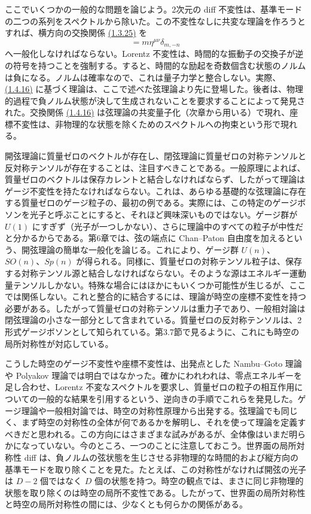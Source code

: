 ここでいくつかの一般的な問題を論じよう。2次元の diff 不変性は、基準モードの二つの系列をスペクトルから除いた。この不変性なしに共変な理論を作ろうとすれば、横方向の交換関係 \hyperref[eq:1.3.25a]{(1.3.25)} を
\begin{equation}
[\alpha_m^\mu,\alpha_n^\nu]=m\eta^{\mu\nu}\delta_{m,-n}
\tag{1.4.16}\label{eq:1.4.16}
\end{equation}
へ一般化しなければならない。Lorentz 不変性は、時間的な振動子の交換子が逆の符号を持つことを強制する。すると、時間的な励起を奇数個含む状態のノルムは負になる。ノルムは確率なので、これは量子力学と整合しない。実際、\hyperref[eq:1.4.16]{(1.4.16)} に基づく理論は、ここで述べた弦理論より先に登場した。後者は、物理的過程で負ノルム状態が決して生成されないことを要求することによって発見された。交換関係 \hyperref[eq:1.4.16]{(1.4.16)} は弦理論の共変量子化（次章から用いる）で現れ、座標不変性は、非物理的な状態を除くためのスペクトルへの拘束という形で現れる。

開弦理論に質量ゼロのベクトルが存在し、閉弦理論に質量ゼロの対称テンソルと反対称テンソルが存在することは、注目すべきことである。一般原理によれば、質量ゼロのベクトルは保存カレントと結合しなければならず、したがって理論はゲージ不変性を持たなければならない。これは、あらゆる基礎的な弦理論に存在する質量ゼロのゲージ粒子の、最初の例である。実際には、この特定のゲージボソンを光子と呼ぶことにすると、それほど興味深いものではない。ゲージ群が $U(1)$ にすぎず（光子が一つしかない）、さらに理論中のすべての粒子が中性だと分かるからである。第6章では、弦の端点に Chan--Paton 自由度を加えるという、開弦理論の簡単な一般化を論じる。これにより、ゲージ群 $U(n)$、$SO(n)$、$Sp(n)$ が得られる。同様に、質量ゼロの対称テンソル粒子は、保存する対称テンソル源と結合しなければならない。そのような源はエネルギー運動量テンソルしかない。特殊な場合にはほかにもいくつか可能性が生じるが、ここでは関係しない。これと整合的に結合するには、理論が時空の座標不変性を持つ必要がある。したがって質量ゼロの対称テンソルは重力子であり、一般相対論は閉弦理論の小さな一部分として含まれている。質量ゼロの反対称テンソルは、2形式ゲージボソンとして知られている。第3.7節で見るように、これにも時空の局所対称性が対応している。

こうした時空のゲージ不変性や座標不変性は、出発点とした Nambu--Goto 理論や Polyakov 理論では明白ではなかった。確かにわれわれは、零点エネルギーを足し合わせ、Lorentz 不変なスペクトルを要求し、質量ゼロの粒子の相互作用についての一般的な結果を引用するという、逆向きの手順でこれらを発見した。ゲージ理論や一般相対論では、時空の対称性原理から出発する。弦理論でも同じく、まず時空の対称性の全体が何であるかを解明し、それを使って理論を定義すべきだと思われる。この方向にはさまざまな試みがあるが、全体像はいまだ明らかになっていない。今のところ、一つのことに注意しておこう。世界面の局所対称性 diff は、負ノルムの弦状態を生じさせる非物理的な時間的および縦方向の基準モードを取り除くことを見た。たとえば、この対称性がなければ開弦の光子は $D-2$ 個ではなく $D$ 個の状態を持つ。時空の観点では、まさに同じ非物理的状態を取り除くのは時空の局所不変性である。したがって、世界面の局所対称性と時空の局所対称性の間には、少なくとも何らかの関係がある。

